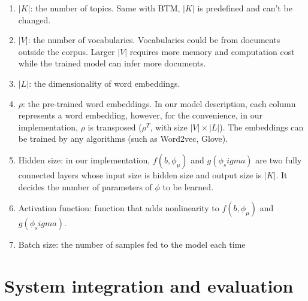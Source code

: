 \begin{enumerate}
    \item $|K|$: the number of topics. Same with BTM, $|K|$ is predefined and can't be changed.
    \item $|V|$: the number of vocabularies. Vocabularies could be from documents outside the corpus. Larger $|V|$ requires more memory and computation cost while the trained model can infer more documents.
    \item $|L|$: the dimensionality of word embeddings. 
    \item $\rho$: the pre-trained word embeddings. In our model description, each column represents a word embedding, however, for the convenience, in our implementation, $\rho$ is transposed ($\rho^T$, with size $|V|\times|L|$). The embeddings can be trained by any algorithms (such as Word2vec, Glove). 
    \item Hidden size: in our implementation, $f(b,\phi_\mu)$ and $g(\phi_sigma)$ are two fully connected layers whose input size is hidden size and output size is $|K|$. It decides the number of parameters of $\phi$ to be learned.
    \item Activation function: function that adds nonlinearity to $f(b,\phi_\mu)$ and $g(\phi_sigma)$.
    \item Batch size: the number of samples fed to the model each time
\end{enumerate}

\section{System integration and evaluation}